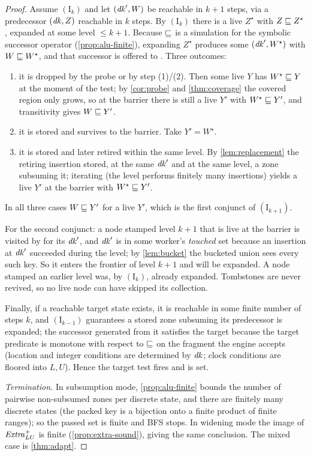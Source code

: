 \begin{proof}
Assume $(\mathrm{I}_k)$ and let $(\mathit{dk}', W)$ be reachable in $k{+}1$ steps, via a
predecessor $(\mathit{dk}, Z)$ reachable in $k$ steps.  By $(\mathrm{I}_k)$ there is a
live $Z^\star$ with $Z \sqsubseteq Z^\star$, expanded at some level $\le k{+}1$.
Because $\sqsubseteq$ is a simulation for the symbolic successor operator
(\cref{prop:alu-finite}), expanding $Z^\star$ produces some $(\mathit{dk}', W^\star)$
with $W \sqsubseteq W^\star$, and that successor is offered to .  Three
outcomes:
\begin{enumerate}[leftmargin=1.6em, itemsep=1pt]
\item it is dropped by the probe or by step (1)/(2).  Then some live $Y$ has
      $W^\star \sqsubseteq Y$ at the moment of the test; by \cref{cor:probe} and
      \cref{thm:coverage} the covered region only grows, so at the barrier there
      is still a live $Y'$ with $W^\star \sqsubseteq Y'$, and transitivity gives
      $W \sqsubseteq Y'$.
\item it is stored and survives to the barrier.  Take $Y' = W^\star$.
\item it is stored and later retired within the same level.  By
      \cref{lem:replacement} the retiring insertion stored, at the same $\mathit{dk}'$
      and at the same level, a zone subsuming it; iterating (the level performs
      finitely many insertions) yields a live $Y'$ at the barrier with
      $W^\star \sqsubseteq Y'$.
\end{enumerate}
In all three cases $W \sqsubseteq Y'$ for a live $Y'$, which is the first conjunct of
$(\mathrm{I}_{k+1})$.

For the second conjunct: a node stamped level $k{+}1$ that is live at the
barrier is visited by  for its $\mathit{dk}'$, and $\mathit{dk}'$ is in some
worker's \emph{touched} set because an insertion at $\mathit{dk}'$ succeeded during the
level; by \cref{lem:bucket} the bucketed union sees every such key.  So it
enters the frontier of level $k{+}1$ and will be expanded.  A node stamped an
earlier level was, by $(\mathrm{I}_k)$, already expanded.  Tombstones are never
revived, so no live node can have skipped its collection.

Finally, if a reachable target state exists, it is reachable in some finite
number of steps $k$, and $(\mathrm{I}_{k-1})$ guarantees a stored zone
subsuming its predecessor is expanded; the successor generated from it
satisfies the target because the target predicate is monotone with respect to
$\sqsubseteq$ on the fragment the engine accepts (location and integer conditions are
determined by $\mathit{dk}$; clock conditions are floored into $L,U$).  Hence the
target test fires and  is set.

\emph{Termination.}  In subsumption mode, \cref{prop:alu-finite} bounds the
number of pairwise non-subsumed zones per discrete state, and there are finitely
many discrete states (the packed key is a bijection onto a finite product of
finite ranges); so the passed set is finite and BFS stops.  In widening mode the
image of $\mathit{Extra}^{+}_{LU}$ is finite (\cref{prop:extra-sound}), giving the same
conclusion.  The mixed case is \cref{thm:adapt}.
\end{proof}

